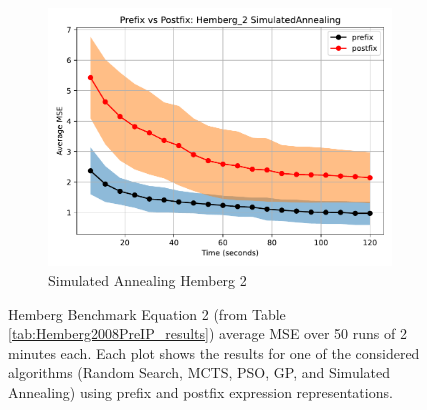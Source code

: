 \documentclass[runningheads]{llncs}
\begin{document}
\begin{figure}
    \vspace{0.5cm}
    
    \begin{subfigure}[b]{0.4\textwidth}
        \includegraphics[width=\linewidth, keepaspectratio]{Hemberg_Benchmarks/PrePostHemberg_2SimulatedAnnealing.pdf}
        \caption{Simulated Annealing Hemberg 2}
        \label{subfig:hemberg_2_SA}
    \end{subfigure}
    
    \caption{Hemberg Benchmark Equation 2 (from Table \ref{tab:Hemberg2008PreIP_results}) average MSE over 50 runs of 2 minutes each. Each plot shows the results for one of the considered algorithms (Random Search, MCTS, PSO, GP, and Simulated Annealing) using prefix and postfix expression representations.}
    \label{fig:Hemberg_2_Benchmarks}
\end{figure}
\end{document}
